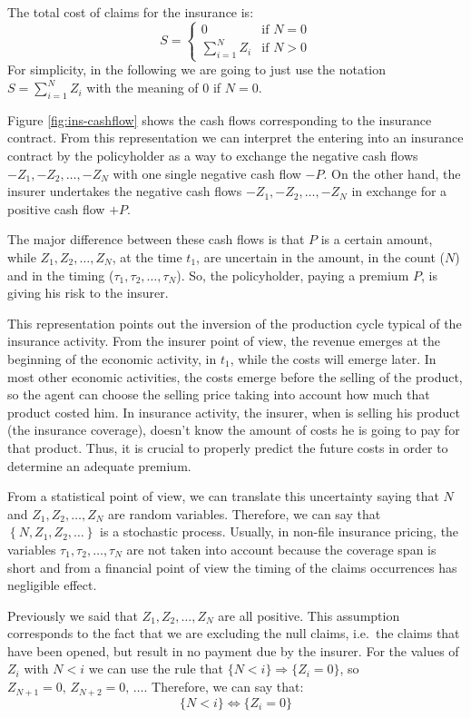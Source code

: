 \documentclass[a4paper, nobind]{templates/ociamthesis}
\theoremstyle{definition}
\theoremstyle{definition}
\theoremstyle{definition}
\theoremstyle{remark}
\begin{document}
The total cost of claims for the insurance is:
\[
S = 
\begin{cases}
  0                    & \text{if } N=0 \\
  \sum_{i=1}^{N}{Z_i}  & \text{if } N>0
\end{cases}
\]
For simplicity, in the following we are going to just use the notation \(S = \sum_{i=1}^{N}{Z_i}\) with the meaning of \(0\) if \(N=0\).

Figure \ref{fig:ins-cashflow} shows the cash flows corresponding to the insurance contract. From this representation we can interpret the entering into an insurance contract by the policyholder as a way to exchange the negative cash flows \(-Z_1, -Z_2, \dots, -Z_N\) with one single negative cash flow \(-P\). On the other hand, the insurer undertakes the negative cash flows \(-Z_1, -Z_2, \dots, -Z_N\) in exchange for a positive cash flow \(+P\).

The major difference between these cash flows is that \(P\) is a certain amount, while \(Z_1, Z_2, \dots, Z_N\), at the time \(t_1\), are uncertain in the amount, in the count (\(N\)) and in the timing (\(\tau_1, \tau_2, \dots, \tau_N\)). So, the policyholder, paying a premium \(P\), is giving his risk to the insurer.

This representation points out the inversion of the production cycle typical of the insurance activity. From the insurer point of view, the revenue emerges at the beginning of the economic activity, in \(t_1\), while the costs will emerge later. In most other economic activities, the costs emerge before the selling of the product, so the agent can choose the selling price taking into account how much that product costed him. In insurance activity, the insurer, when is selling his product (the insurance coverage), doesn't know the amount of costs he is going to pay for that product. Thus, it is crucial to properly predict the future costs in order to determine an adequate premium.

From a statistical point of view, we can translate this uncertainty saying that \(N\) and \(Z_1, Z_2, \dots, Z_N\) are random variables. Therefore, we can say that \(\left\{N, Z_1, Z_2, \dots \right\}\) is a stochastic process. Usually, in non-file insurance pricing, the variables \(\tau_1, \tau_2, \dots, \tau_N\) are not taken into account because the coverage span is short and from a financial point of view the timing of the claims occurrences has negligible effect.

Previously we said that \(Z_1, Z_2, \dots, Z_N\) are all positive. This assumption corresponds to the fact that we are excluding the null claims, i.e.~the claims that have been opened, but result in no payment due by the insurer. For the values of \(Z_i\) with \(N<i\) we can use the rule that \(\{N<i\} \Rightarrow \{Z_i = 0\}\), so \(Z_{N+1}=0, \, Z_{N+2}=0, \, \dots\). Therefore, we can say that:
\[
\{N<i \} \Longleftrightarrow \{Z_i = 0\}
\]
\end{document}
